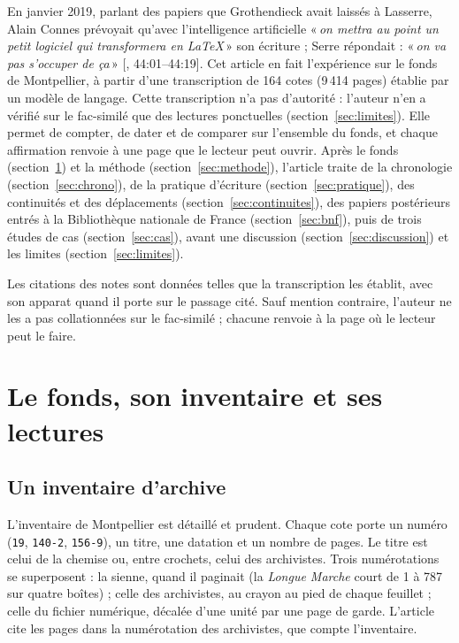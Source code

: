 \documentclass[11pt]{amsart}
\newcommand{\ts}[1]{\foreignlanguage{english}{#1}}
\newcommand{\q}[1]{«\,\textit{#1}\,»}
\begin{document}
En janvier 2019, parlant des papiers que Grothendieck avait laissés à Lasserre, Alain Connes prévoyait qu'avec l'intelligence artificielle \q{on mettra au point un petit logiciel qui transformera en LaTeX} son écriture ; Serre répondait : \q{on va pas s'occuper de ça} [\citealp{serreconnes2019}, \ts{44:01--44:19}]. Cet article en fait l'expérience sur le fonds de Montpellier, à partir d'une transcription de 164 cotes (9\,414 pages) établie par un modèle de langage. Cette transcription n'a pas d'autorité : l'auteur n'en a vérifié sur le fac-similé que des lectures ponctuelles (section~\ref{sec:limites}). Elle permet de compter, de dater et de comparer sur l'ensemble du fonds, et chaque affirmation renvoie à une page que le lecteur peut ouvrir. Après le fonds (section~\ref{sec:fonds}) et la méthode (section~\ref{sec:methode}), l'article traite de la chronologie (section~\ref{sec:chrono}), de la pratique d'écriture (section~\ref{sec:pratique}), des continuités et des déplacements (section~\ref{sec:continuites}), des papiers postérieurs entrés à la Bibliothèque nationale de France (section~\ref{sec:bnf}), puis de trois études de cas (section~\ref{sec:cas}), avant une discussion (section~\ref{sec:discussion}) et les limites (section~\ref{sec:limites}).

Les citations des notes sont données telles que la transcription les établit, avec son apparat quand il porte sur le passage cité. Sauf mention contraire, l'auteur ne les a pas collationnées sur le fac-similé ; chacune renvoie à la page où le lecteur peut le faire.

\section{Le fonds, son inventaire et ses lectures}\label{sec:fonds}

\subsection{Un inventaire d'archive}

L'inventaire de Montpellier est détaillé et prudent. Chaque cote porte un numéro (\texttt{19}, \texttt{140-2}, \texttt{156-9}), un titre, une datation et un nombre de pages. Le titre est celui de la chemise ou, entre crochets, celui des archivistes. Trois numérotations se superposent : la sienne, quand il paginait (la \emph{Longue Marche} court de 1 à 787 sur quatre boîtes) ; celle des archivistes, au crayon au pied de chaque feuillet ; celle du fichier numérique, décalée d'une unité par une page de garde. L'article cite les pages dans la numérotation des archivistes, que compte l'inventaire.
\end{document}
